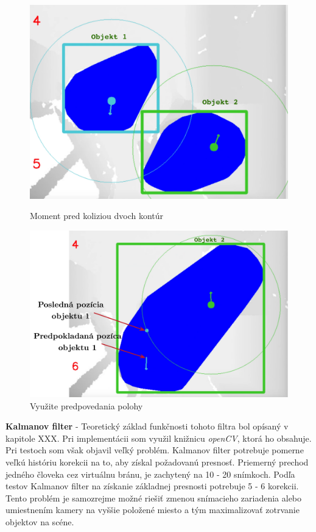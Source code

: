 \begin{figure}[H]
  \centering
  \begin{minipage}[b]{0.4\textwidth}
    \includegraphics[width=\textwidth]{images/beforeCollision}
    \caption{Moment pred koliziou dvoch kontúr}
  \end{minipage}
  \hfill
  \begin{minipage}[b]{0.55\textwidth}
    \includegraphics[width=\textwidth]{images/predicate}
    \caption{Využite predpovedania polohy}
  \end{minipage}
\end{figure}



\textbf{Kalmanov filter} - Teoretický základ funkčnosti tohoto filtra bol opísaný v kapitole XXX. Pri implementácii som využil knižnicu \textit{openCV}, ktorá ho obsahuje. Pri testoch som však objavil veľký problém. Kalmanov filter potrebuje pomerne veľkú históriu korekcii na to, aby získal požadovanú presnosť. Priemerný prechod jedného človeka cez virtuálnu bránu, je zachytený na 10 - 20 snímkoch. Podľa testov Kalmanov filter na získanie základnej presnosti potrebuje 5 - 6 korekcii. Tento problém je samozrejme možné riešiť zmenou snímacieho zariadenia alebo umiestnením kamery na vyššie položené miesto a tým maximalizovať zotrvanie objektov na scéne. 

